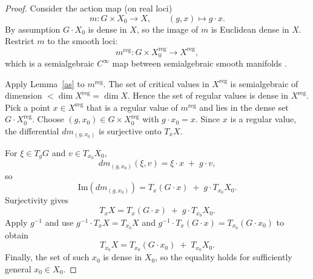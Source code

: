 \documentclass[11pt]{amsart}
\theoremstyle{plain}
\theoremstyle{definition}
\theoremstyle{remark}
\begin{document}
\begin{proof}
Consider the action map (on real loci)
\[
m : G \times X_{0} \longrightarrow X, \qquad (g,x)\longmapsto g\cdot x .
\]
By assumption $G\cdot X_0$ is dense in $X$, so the image of $m$ is Euclidean dense in $X$.
Restrict $m$ to the smooth loci:
\[
m^{\mathrm{reg}} : G \times X_{0}^{\mathrm{reg}} \longrightarrow X^{\mathrm{reg}},
\]
which is a semialgebraic $C^\infty$ map between semialgebraic smooth manifolds .

Apply Lemma~\ref{as} to $m^{\mathrm{reg}}$. The set of critical values in $X^{\mathrm{reg}}$ is semialgebraic
of dimension $<\dim X^{\mathrm{reg}}=\dim X$. Hence the set of regular values is dense in $X^{\mathrm{reg}}$.
Pick a point $x\in X^{\mathrm{reg}}$ that is a regular value of $m^{\mathrm{reg}}$ and lies in the dense set
$G\cdot X_{0}^{\mathrm{reg}}$. Choose $(g,x_0)\in G\times X_{0}^{\mathrm{reg}}$ with $g\cdot x_0=x$.
Since $x$ is a regular value, the differential $dm_{(g,x_0)}$ is surjective onto $T_xX$.

For $\xi\in T_gG$ and $v\in T_{x_0}X_0$,
\[
dm_{(g,x_0)}(\xi,v)=\xi\cdot x \;+\; g\cdot v,
\]
so
\[
\mathrm{Im}(dm_{(g,x_0)}) = T_x(G\cdot x) \;+\; g\cdot T_{x_0}X_0.
\]
Surjectivity gives
\[
T_xX = T_x(G\cdot x) \;+\; g\cdot T_{x_0}X_0.
\]
Apply $g^{-1}$ and use $g^{-1}\cdot T_xX=T_{x_0}X$ and
$g^{-1}\cdot T_x(G\cdot x)=T_{x_0}(G\cdot x_0)$ to obtain
\[
T_{x_0}X = T_{x_0}(G\cdot x_0) \;+\; T_{x_0}X_0.
\]
Finally, the set of such $x_0$ is dense in $X_0$,
so the equality holds for sufficiently general $x_0\in X_0$.
\end{proof}
\end{document}

